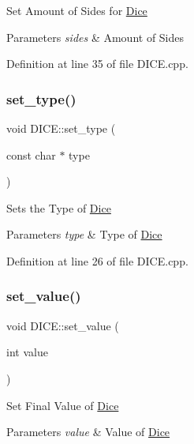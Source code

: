 Set Amount of Sides for \mbox{\hyperlink{namespace_dice}{Dice}} 


\begin{DoxyParams}{Parameters}
{\em sides} & Amount of Sides\\
\hline
\end{DoxyParams}


Definition at line 35 of file D\+I\+C\+E.\+cpp.

\mbox{\label{class_d_i_c_e_a72091c029e5bd18b12451551951e9cdc}} 
\subsubsection{\texorpdfstring{set\_type()}{set\_type()}}
{\footnotesize\ttfamily void D\+I\+C\+E\+::set\+\_\+type (\begin{DoxyParamCaption}\item[{const char $\ast$}]{type }\end{DoxyParamCaption})}



Sets the Type of \mbox{\hyperlink{namespace_dice}{Dice}} 


\begin{DoxyParams}{Parameters}
{\em type} & Type of \mbox{\hyperlink{namespace_dice}{Dice}}\\
\hline
\end{DoxyParams}


Definition at line 26 of file D\+I\+C\+E.\+cpp.

\mbox{\label{class_d_i_c_e_a6f2c5ce710807924ff8725de3b025cee}} 
\subsubsection{\texorpdfstring{set\_value()}{set\_value()}}
{\footnotesize\ttfamily void D\+I\+C\+E\+::set\+\_\+value (\begin{DoxyParamCaption}\item[{int}]{value }\end{DoxyParamCaption})}



Set Final Value of \mbox{\hyperlink{namespace_dice}{Dice}} 


\begin{DoxyParams}{Parameters}
{\em value} & Value of \mbox{\hyperlink{namespace_dice}{Dice}}\\
\hline
\end{DoxyParams}



